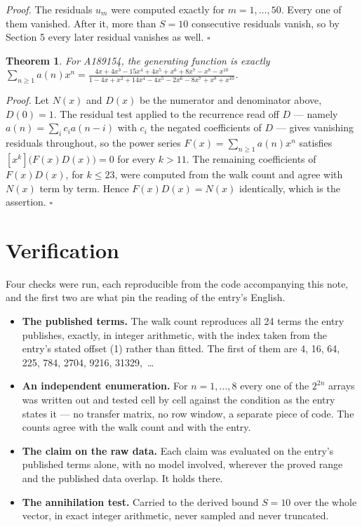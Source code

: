 \documentclass[11pt]{article}
\newtheorem{theorem}{Theorem}
\theoremstyle{definition}
\begin{document}
{\itshape Proof.} The residuals $u_m$ were computed exactly for $m = 1,\dots,50$. Every one of them vanished. After it, more than $S = 10$ consecutive residuals vanish, so by Section 5 every later residual vanishes as well. $\square$

\begin{theorem} For A189154, the generating function is exactly $\sum_{n\ge 1} a(n)x^n = \frac{4x + 4x^{3} - 15x^{4} + 4x^{5} + x^{6} + 8x^{7} - x^{8} - x^{10}}{1 - 4x + x^{2} + 14x^{4} - 4x^{5} - 2x^{6} - 8x^{7} + x^{8} + x^{10}}$.\end{theorem}

{\itshape Proof.} Let $N(x)$ and $D(x)$ be the numerator and denominator above, $D(0)=1$. The residual test applied to the recurrence read off $D$ --- namely $a(n) = \sum_i c_i a(n-i)$ with $c_i$ the negated coefficients of $D$ --- gives vanishing residuals throughout, so the power series $F(x)=\sum_{n\ge 1}a(n)x^n$ satisfies $[x^k]\bigl(F(x)D(x)\bigr) = 0$ for every $k > 11$. The remaining coefficients of $F(x)D(x)$, for $k \le 23$, were computed from the walk count and agree with $N(x)$ term by term. Hence $F(x)D(x) = N(x)$ identically, which is the assertion. $\square$

\section{Verification}

Four checks were run, each reproducible from the code accompanying this note, and the first two are what pin the reading of the entry's English.

\begin{itemize}

\item {\bfseries The published terms.} The walk count reproduces all 24 terms the entry publishes, exactly, in integer arithmetic, with the index taken from the entry's stated offset (1) rather than fitted. The first of them are 4, 16, 64, 225, 784, 2704, 9216, 31329,~\dots

\item {\bfseries An independent enumeration.} For $n = 1,\dots,8$ every one of the $2^{2n}$ arrays was written out and tested cell by cell against the condition as the entry states it --- no transfer matrix, no row window, a separate piece of code. The counts agree with the walk count and with the entry.

\item {\bfseries The claim on the raw data.} Each claim was evaluated on the entry's published terms alone, with no model involved, wherever the proved range and the published data overlap. It holds there.

\item {\bfseries The annihilation test.} Carried to the derived bound $S = 10$ over the whole vector, in exact integer arithmetic, never sampled and never truncated.

\end{itemize}
\end{document}
